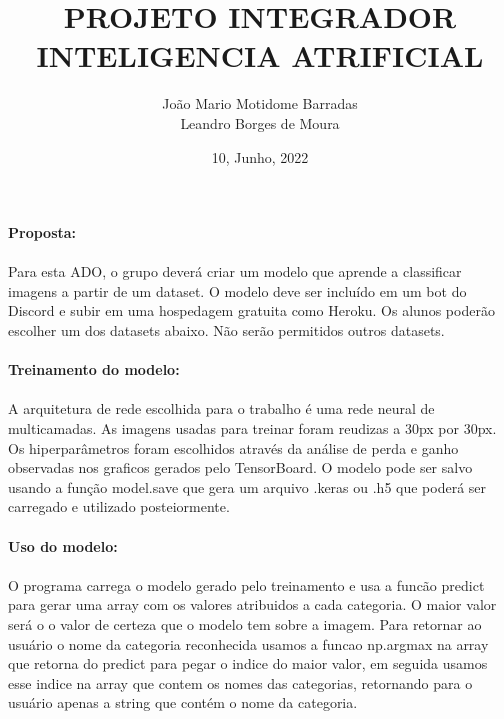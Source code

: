\documentclass[11pt]{article}
\title{PROJETO INTEGRADOR\\INTELIGENCIA ATRIFICIAL}
\author{João Mario Motidome Barradas\\Leandro Borges de Moura}
\date{10, Junho, 2022}
\begin{document}
\maketitle

\paragraph{Proposta:}

\paragraph{}

Para esta ADO, o grupo deverá criar um modelo que aprende a classificar imagens a partir de um dataset. O modelo deve ser incluído em um bot do Discord e subir em uma hospedagem gratuita como Heroku. Os alunos poderão escolher um dos datasets abaixo. Não serão permitidos outros datasets.


\paragraph{Treinamento do modelo:}

\paragraph{}

A arquitetura de rede escolhida para o trabalho é uma rede neural de multicamadas. As imagens usadas para treinar foram reudizas a 30px por 30px. Os hiperparâmetros foram escolhidos através da análise de perda e ganho observadas nos graficos gerados pelo TensorBoard. O modelo pode ser salvo usando a função model.save que gera um arquivo .keras ou .h5 que poderá ser carregado e utilizado posteiormente.


\paragraph{Uso do modelo:}

\paragraph{}

O programa carrega o modelo gerado pelo treinamento e usa a funcão predict para gerar uma array com os valores atribuidos a cada categoria. O maior valor será o o valor de certeza que o modelo tem sobre a imagem. Para retornar ao usuário o nome da categoria reconhecida usamos a funcao np.argmax na array que retorna do predict para pegar o indice do maior valor, em seguida usamos esse indice na array que contem os nomes das categorias, retornando para o usuário apenas a string que contém o nome da categoria.
\end{document}
